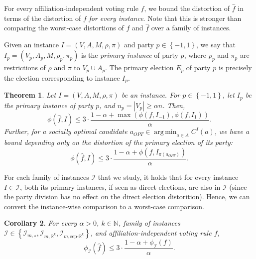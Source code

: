 \documentclass[letterpaper]{article} %
\newtheorem{theorem}{Theorem}
\newtheorem{corollary}[theorem]{Corollary}
\theoremstyle{definition}
\newcommand{\set}[1]{\left\{#1\right\}}
\renewcommand{\hat}{\widehat}
\DeclareMathOperator*{\argmin}{\arg\,\min}
\newcommand{\bbN}{\mathbb{N}}
\newcommand{\bbR}{\mathbb{R}}
\newcommand{\calI}{\mathcal{I}}
\newcommand{\pleft}{-1}
\newcommand{\pright}{1}
\newcommand{\all}{\star}
\newcommand{\sep}{\textrm{sep-}}
\newcommand{\euc}[1]{\bbR^{#1}}
\newcommand{\eucsep}[1]{\sep\euc{#1}}
\newcommand{\I}{\calI}
\begin{document}
For every affiliation-independent voting rule $f$, we bound the distortion of $\hat{f}$ in terms of the distortion of $f$ \emph{for every instance}. Note that this is stronger than comparing the worst-case distortions of $f$ and $\hat{f}$ over a family of instances.

Given an instance $I = (V,A,M,\rho,\pi)$ and party $p \in \set{\pleft,\pright}$, we say that $I_p = (V_p,A_p,M,\rho_p,\pi_p)$ is the \emph{primary instance} of party $p$, where $\rho_p$ and $\pi_p$ are restrictions of $\rho$ and $\pi$ to $V_p \cup A_p$. The primary election $E_p$ of party $p$ is precisely the election corresponding to instance $I_p$.


\begin{theorem}
	Let $I = (V,A,M,\rho,\pi)$ be an instance. For $p \in \set{\pleft,\pright}$, let $I_p$ be the primary instance of party $p$, and $n_p = |V_p| \ge \alpha n$. Then,
	$$
	\phi(\hat{f},I) \le 3 \cdot \frac{1-\alpha+\max(\phi(f,I_{\pleft}),\phi(f,I_{\pright}))}{\alpha}.
	$$
	Further, for a socially optimal candidate $a_{OPT} \in \argmin_{a \in A} C^I(a)$, we have a bound depending only on the distortion of the primary election of its party:
	$$
	\phi(\hat{f},I) \le 3 \cdot \frac{1-\alpha+\phi(f,I_{\pi(a_{OPT})})}{\alpha}.
	$$

\label{thm:large-primaries-good}
\end{theorem}

For each family of instances $\I$ that we study, it holds that for every instance $I \in \calI$, both its primary instances, if seen as direct elections, are also in $\I$ (since the party division has no effect on the direct election distorition). Hence, we can convert the instance-wise comparison to a worst-case comparison.

\begin{corollary}
\label{cor:large-primaries-good}
	For every $\alpha > 0$, $k \in \bbN$, family of instances $\I \in \set{\I_{m,\all},\I_{m,\euc{k}},\I_{m,\eucsep{k}}}$, and affiliation-independent voting rule $f$,
	$$
	\phi_{\I}(\hat{f}) \le 3\cdot \frac{1-\alpha+\phi_{\I}(f)}{\alpha}.
	$$
\end{corollary}
\end{document}

